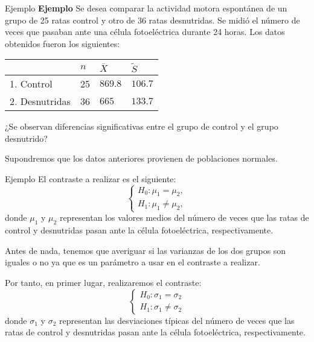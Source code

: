 \documentclass[
  ignorenonframetext,
]{beamer}
\begin{document}
\begin{frame}{Ejemplo}
\protect\hypertarget{ejemplo-23}{}
\textbf{Ejemplo} Se desea comparar la actividad motora espontánea de un
grupo de 25 ratas control y otro de 36 ratas desnutridas. Se midió el
número de veces que pasaban ante una célula fotoeléctrica durante 24
horas. Los datos obtenidos fueron los siguientes:

\begin{longtable}[]{@{}llll@{}}
\toprule
& \(n\) & \(\overline{X}\) & \(\widetilde{S}\)\tabularnewline
\midrule
\endhead
1. Control & 25 & \(869.8\) & \(106.7\)\tabularnewline
2. Desnutridas & 36 & \(665\) & \(133.7\)\tabularnewline
\bottomrule
\end{longtable}

¿Se observan diferencias significativas entre el grupo de control y el
grupo desnutrido?

Supondremos que los datos anteriores provienen de poblaciones normales.
\end{frame}

\begin{frame}{Ejemplo}
\protect\hypertarget{ejemplo-24}{}
El contraste a realizar es el siguiente: \[
\left\{\begin{array}{l}
H_0:\mu_1=\mu_2,\\
H_1:\mu_1\neq \mu_2,
\end{array}\right.
\] donde \(\mu_1\) y \(\mu_2\) representan los valores medios del número
de veces que las ratas de control y desnutridas pasan ante la célula
fotoeléctrica, respectivamente.

Antes de nada, tenemos que averiguar si las varianzas de los dos grupos
son iguales o no ya que es un parámetro a usar en el contraste a
realizar.

Por tanto, en primer lugar, realizaremos el contraste: \[
\left\{\begin{array}{l}
H_0:\sigma_1=\sigma_2\\
H_1:\sigma_1\neq \sigma_2
\end{array}\right.
\] donde \(\sigma_1\) y \(\sigma_2\) representan las desviaciones
típicas del número de veces que las ratas de control y desnutridas pasan
ante la célula fotoeléctrica, respectivamente.
\end{frame}
\end{document}
